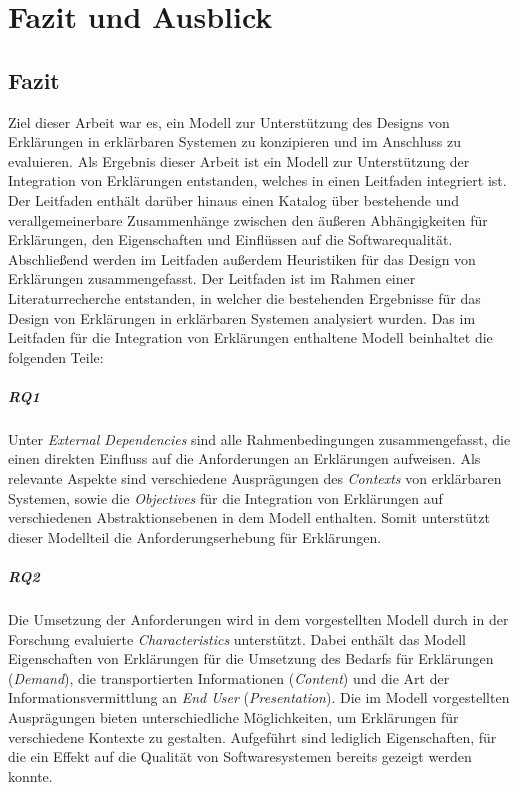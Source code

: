 \chapter{Fazit und Ausblick}

\section{Fazit}

Ziel dieser Arbeit war es, ein Modell zur Unterstützung des Designs von Erklärungen in erklärbaren Systemen zu konzipieren und im Anschluss zu evaluieren. Als Ergebnis dieser Arbeit ist ein Modell zur Unterstützung der Integration von Erklärungen entstanden, welches in einen Leitfaden integriert ist. Der Leitfaden enthält darüber hinaus einen Katalog über bestehende und verallgemeinerbare Zusammenhänge zwischen den äußeren Abhängigkeiten für Erklärungen, den Eigenschaften und Einflüssen auf die Softwarequalität. Abschließend werden im Leitfaden außerdem Heuristiken für das Design von Erklärungen zusammengefasst. Der Leitfaden ist im Rahmen einer Literaturrecherche entstanden, in welcher die bestehenden Ergebnisse für das Design von Erklärungen in erklärbaren Systemen analysiert wurden. Das im Leitfaden für die Integration von Erklärungen enthaltene Modell beinhaltet die folgenden Teile:

\paragraph{RQ1} Unter \textit{External Dependencies} sind alle Rahmenbedingungen zusammengefasst, die einen direkten Einfluss auf die Anforderungen an Erklärungen aufweisen. Als relevante Aspekte sind verschiedene Ausprägungen des \textit{Contexts} von erklärbaren Systemen, sowie die \textit{Objectives} für die Integration von Erklärungen auf verschiedenen Abstraktionsebenen in dem Modell enthalten. Somit unterstützt dieser Modellteil die Anforderungserhebung für Erklärungen.

\paragraph{RQ2} Die Umsetzung der Anforderungen wird in dem vorgestellten Modell durch in der Forschung evaluierte \textit{Characteristics} unterstützt. Dabei enthält das Modell Eigenschaften von Erklärungen für die Umsetzung des Bedarfs für Erklärungen (\textit{Demand}), die transportierten Informationen (\textit{Content}) und die Art der Informationsvermittlung an \textit{End User} (\textit{Presentation}). Die im Modell vorgestellten Ausprägungen bieten unterschiedliche Möglichkeiten, um Erklärungen für verschiedene Kontexte zu gestalten. Aufgeführt sind lediglich Eigenschaften, für die ein Effekt auf die Qualität von Softwaresystemen bereits gezeigt werden konnte.

